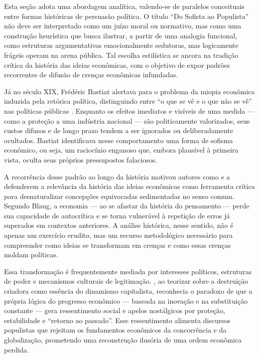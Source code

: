 Esta seção adota uma abordagem analítica, valendo-se de paralelos conceituais entre formas históricas de persuasão política. O título ``Do Sofista ao Populista'' não deve ser interpretado como um juízo moral ou normativo, mas como uma construção heurística que busca ilustrar, a partir de uma analogia funcional, como estruturas argumentativas emocionalmente sedutoras, mas logicamente frágeis operam na arena pública. Tal escolha estilística se ancora na tradição crítica da história das ideias econômicas, com o objetivo de expor padrões recorrentes de difusão de crenças econômicas infundadas.

Já no século XIX, Frédéric Bastiat alertava para o problema da miopia econômica induzida pela retórica política, distinguindo entre ``o que se vê e o que não se vê'' nas políticas públicas \cite{bastiat1859sofismas}. Enquanto os efeitos imediatos e visíveis de uma medida — como a proteção a uma indústria nacional — são politicamente valorizados, seus custos difusos e de longo prazo tendem a ser ignorados ou deliberadamente ocultados. Bastiat identificava nesse comportamento uma forma de sofisma econômico, ou seja, um raciocínio enganoso que, embora plausível à primeira vista, oculta seus próprios pressupostos falaciosos.

A recorrência desse padrão ao longo da história motivou autores como  e  a defenderem a relevância da história das ideias econômicas como ferramenta crítica para desnaturalizar concepções equivocadas sedimentadas no senso comum. Segundo Blaug, a economia — ao se afastar da história do pensamento — perde sua capacidade de autocrítica e se torna vulnerável à repetição de erros já superados em contextos anteriores. A análise histórica, nesse sentido, não é apenas um exercício erudito, mas um recurso metodológico necessário para compreender como ideias se transformam em crenças e como essas crenças moldam políticas.

Essa transformação é frequentemente mediada por interesses políticos, estruturas de poder e mecanismos culturais de legitimação. , ao teorizar sobre a destruição criadora como essência do dinamismo capitalista, reconhecia o paradoxo de que a própria lógica do progresso econômico — baseada na inovação e na substituição constante — gera ressentimento social e apelos nostálgicos por proteção, estabilidade e ``retorno ao passado''. Esse ressentimento alimenta discursos populistas que rejeitam os fundamentos econômicos da concorrência e da globalização, prometendo uma reconstrução ilusória de uma ordem econômica perdida.

